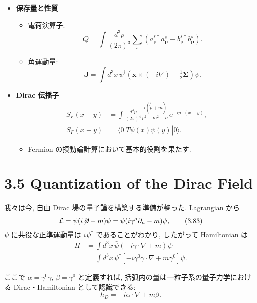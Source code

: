 \documentclass[a4paper,12pt]{article}
\begin{document}
\begin{itemize}
  \item \textbf{保存量と性質}
  \begin{itemize}
    \item 電荷演算子:
    \[
    Q = \int \frac{d^3p}{(2\pi)^3} \sum_s 
    \left( a^{s\dagger}_{\mathbf{p}} a^s_{\mathbf{p}} 
    - b^{s\dagger}_{\mathbf{p}} b^s_{\mathbf{p}} \right).
    \]
    \item 角運動量:
    \[
    \mathbf{J} = \int d^3x \, 
    \psi^\dagger \left( \mathbf{x}\times(-i\nabla) 
    + \tfrac{1}{2}\boldsymbol{\Sigma} \right)\psi .
    \]
  \end{itemize}

  \item \textbf{Dirac 伝播子}
  \begin{align*}
  S_F(x-y) &= \int \frac{d^4p}{(2\pi)^4} 
  \frac{i(\not{p}+m)}{p^2-m^2+i\epsilon} e^{-ip\cdot(x-y)} , \\
  S_F(x-y) &= \langle 0| T\psi(x)\bar{\psi}(y)|0\rangle .
  \end{align*}
  \begin{itemize}
    \item Fermion の摂動論計算において基本的役割を果たす.
  \end{itemize}
\end{itemize}


\newpage
\color{black}
\section*{3.5 Quantization of the Dirac Field}

我々は今, 自由 Dirac 場の量子論を構築する準備が整った. Lagrangian から
\begin{equation}
\mathcal{L} = \bar{\psi}(i\!\not\!\partial - m)\psi 
= \bar{\psi}(i\gamma^\mu \partial_\mu - m)\psi ,
\tag{3.83}
\end{equation}
$\psi$ に共役な正準運動量は $i\psi^\dagger$ であることがわかり, したがって Hamiltonian は
\begin{align}
H &= \int d^3x \, \bar{\psi}(-i\gamma\cdot\nabla + m)\psi \\
  &= \int d^3x \, \psi^\dagger \left[ -i\gamma^0 \gamma \cdot \nabla + m\gamma^0 \right]\psi .
\tag{3.84}
\end{align}

ここで $\alpha = \gamma^0 \gamma$, $\beta = \gamma^0$ と定義すれば, 括弧内の量は一粒子系の量子力学における Dirac・Hamiltonian として認識できる:
\begin{equation}
h_D = -i \alpha \cdot \nabla + m \beta .
\tag{3.85}
\end{equation}
\end{document}
